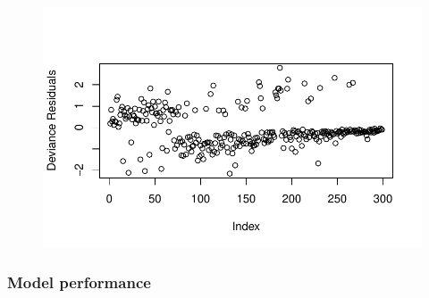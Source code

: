 \documentclass[
  letterpaper,
  DIV=11,
  numbers=noendperiod]{scrartcl}
\begin{document}
\begin{figure}[H]

{\centering \includegraphics{SDS-291-final-project-report_files/figure-pdf/unnamed-chunk-9-4.pdf}

}

\end{figure}

\hypertarget{model-performance-1}{%
\subsubsection{Model performance}\label{model-performance-1}}
\end{document}
